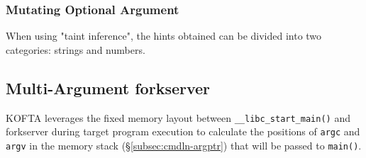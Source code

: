 
\subsubsection{Mutating Optional Argument} %

When using "taint inference", the hints obtained can be divided into two categories: strings and numbers.

\fi %

\iffalse

\subsection{Multi-Argument forkserver}
\iffalse
KOFTA 利用目標程式執行時，\texttt{\_\_libc\_start\_main()} 至 forkserver 間記憶體佈局固定的特點，推算出即將傳入 \texttt{main()} 之 \texttt{argc} 與 \texttt{argv} 在記憶體堆疊中的位置（\S \ref{subsec:cmdln-argptr}）。
\else
KOFTA leverages the fixed memory layout between \texttt{\_\_libc\_start\_main()} and forkserver during target program execution to calculate the positions of \texttt{argc} and \texttt{argv} in the memory stack (\S \ref{subsec:cmdln-argptr}) that will be passed to \texttt{main()}.
\fi


